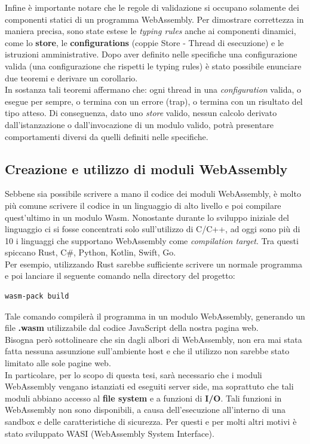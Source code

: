 Infine è importante notare che le regole di validazione si occupano solamente dei componenti statici di un programma WebAssembly. Per dimostrare correttezza in maniera precisa, sono state estese le \emph{typing rules} anche ai componenti dinamici, come lo \textbf{store}, le \textbf{configurations} (coppie Store - Thread di esecuzione) e le istruzioni amministrative.
Dopo aver definito nelle specifiche una configurazione valida (una configurazione che rispetti le typing rules) è stato possibile enunciare due teoremi e derivare un corollario.
\\In sostanza tali teoremi affermano che: ogni thread in una \emph{configuration} valida, o esegue per sempre, o termina con un errore (trap), o termina con un risultato del tipo atteso. Di conseguenza, dato uno \emph{store} valido, nessun calcolo derivato dall'istanzazione o dall'invocazione di un modulo valido, potrà presentare comportamenti diversi da quelli definiti nelle specifiche. \cite*{wasm:soundness:theorems}
\subsection{Creazione e utilizzo di moduli WebAssembly}
Sebbene sia possibile scrivere a mano il codice dei moduli WebAssembly, è molto più comune scrivere il codice in un linguaggio di alto livello e poi compilare quest'ultimo in un modulo Wasm.
Nonostante durante lo sviluppo iniziale del linguaggio ci si fosse concentrati solo sull'utilizzo di C/C++, ad oggi sono più di 10 i linguaggi che supportano WebAssembly come \emph{compilation target}. Tra questi spiccano Rust, C\#, Python, Kotlin, Swift, Go. 
\\Per esempio, utilizzando Rust sarebbe sufficiente scrivere un normale programma e poi lanciare il seguente comando nella directory del progetto: 
\begin{lstlisting}[language=Bash, numbers=none, label=lst:RustCompile, caption={}]
wasm-pack build
\end{lstlisting}
Tale comando compilerà il programma in un modulo WebAssembly, generando un file \textbf{.wasm} utilizzabile dal codice JavaScript della nostra pagina web.
\\Bisogna però sottolineare che sin dagli albori di WebAssembly, non era mai stata fatta nessuna assunzione sull'ambiente host e che il utilizzo non sarebbe stato limitato alle sole pagine web.
\\In particolare, per lo scopo di questa tesi, sarà necessario che i moduli WebAssembly vengano istanziati ed eseguiti server side, ma soprattuto che tali moduli abbiano accesso al \textbf{file system} e a funzioni di \textbf{I/O}.
Tali funzioni in WebAssembly non sono disponibili, a causa dell'esecuzione all'interno di una sandbox e delle caratteristiche di sicurezza. Per questi e per molti altri motivi è stato sviluppato WASI (WebAssembly System Interface).
\newpage
